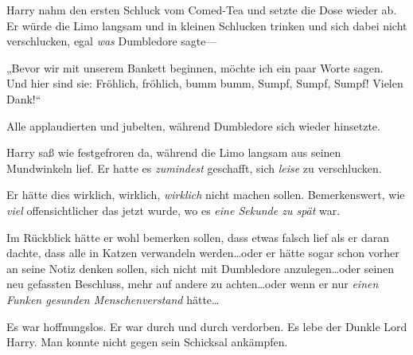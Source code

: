 Harry nahm den ersten Schluck vom Comed-Tea und setzte die Dose wieder ab. Er würde die Limo langsam und in kleinen Schlucken trinken und sich dabei nicht verschlucken, egal \emph{was} Dumbledore sagte—

„Bevor wir mit unserem Bankett beginnen, möchte ich ein paar Worte sagen. Und hier sind sie: Fröhlich, fröhlich, bumm bumm, Sumpf, Sumpf, Sumpf! Vielen Dank!“

Alle applaudierten und jubelten, während Dumbledore sich wieder hinsetzte.

Harry saß wie festgefroren da, während die Limo langsam aus seinen Mundwinkeln lief. Er hatte es \emph{zumindest} geschafft, sich \emph{leise} zu verschlucken.

Er hätte dies wirklich, wirklich, \emph{wirklich} nicht machen sollen. Bemerkenswert, wie \emph{viel} offensichtlicher das jetzt wurde, wo es \emph{eine Sekunde zu spät} war.

Im Rückblick hätte er wohl bemerken sollen, dass etwas falsch lief als er daran dachte, dass alle in Katzen verwandeln werden…oder er hätte sogar schon vorher an seine Notiz denken sollen, sich nicht mit Dumbledore anzulegen…oder seinen neu gefassten Beschluss, mehr auf andere zu achten…oder wenn er nur \emph{einen Funken gesunden Menschenverstand} hätte…

Es war hoffnungslos. Er war durch und durch verdorben. Es lebe der Dunkle Lord Harry. Man konnte nicht gegen sein Schicksal ankämpfen.


